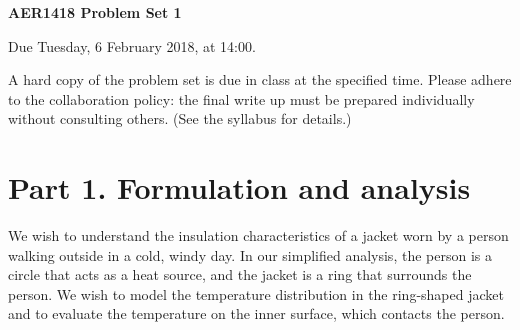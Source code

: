 \documentclass[preprint,11pt]{article}
\begin{document}
\noindent\begin{Large}\textbf{AER1418 Problem Set 1}\end{Large} \hfill Due Tuesday, 6 February 2018, at 14:00.

\vspace{1em}
\noindent A hard copy of the problem set is due in class at the specified time.  %
Please adhere to the collaboration policy: the final write up must be prepared individually without consulting others. (See the syllabus for details.)

\section*{Part 1. Formulation and analysis}
We wish to understand the insulation characteristics of a jacket worn by a person walking outside in a cold, windy day.  In our simplified analysis, the person is a circle that acts as a heat source, and the jacket is a ring that surrounds the person. We wish to model the temperature distribution in the ring-shaped jacket and to evaluate the temperature on the inner surface, which contacts the person.
\end{document}

